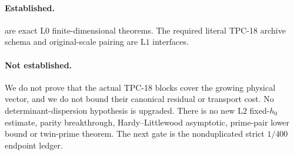 \documentclass[11pt]{article}
\theoremstyle{definition}
\theoremstyle{remark}
\newcommand{\Lzero}{\mathrm{L0}}
\newcommand{\Lone}{\mathrm{L1}}
\newcommand{\Ltwo}{\mathrm{L2}}
\begin{document}
\paragraph{Established.}
 are exact
\(\Lzero\) finite-dimensional theorems.  The required literal
TPC-18 archive schema and original-scale pairing are \(\Lone\)
interfaces.

\paragraph{Not established.}
We do not prove that the actual TPC-18 blocks cover the growing
physical vector, and we do not bound their canonical residual or
transport cost.  No determinant-dispersion hypothesis is upgraded.
There is no new \(\Ltwo\) fixed-\(h_0\) estimate, parity
breakthrough, Hardy--Littlewood asymptotic, prime-pair lower bound or
twin-prime theorem.  The next gate is the nonduplicated strict
\(1/400\) endpoint ledger.

\begingroup
\small
\setlength{\bibsep}{2pt plus 0.3ex}
\sloppy


\endgroup
\end{document}
